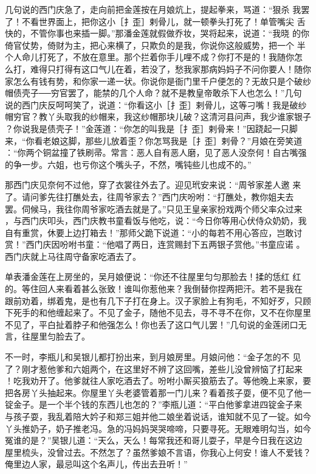 几句说的西门庆急了，走向前把金莲按在月娘炕上，提起拳来，骂道：“狠杀
我罢了！不看世界面上，把你这小［扌歪］剌骨儿，就一顿拳头打死了！单管嘴尖
舌快的，不管你事也来插一脚。”那潘金莲就假做乔妆，哭将起来，说道：“我晓
的你倚官仗势，倚财为主，把心来横了，只欺负的是我，你说你这般威势，把一个
半个人命儿打死了，不放在意里。那个拦着你手儿哩不成？你打不是的！我随你怎
么打，难得只打得有这口气儿在着，若没了，愁我家那病妈妈子不问你要人！随你
家怎么有钱有势，和你家一递一状。你说你是衙门里千户便怎的？无故只是个破纱
帽债壳子──穷官罢了，能禁的几个人命？就不是教皇帝敢杀下人也怎么！”几句
说的西门庆反呵呵笑了，说道：“你看这小［扌歪］剌骨儿，这等刁嘴！我是破纱
帽穷官？教丫头取我的纱帽来，我这纱帽那块儿破？这清河县问声，我少谁家银子
？你说我是债壳子！”金莲道：“你怎的叫我是［扌歪］剌骨来！”因跷起一只脚
来，“你看老娘这脚，那些儿放着歪？你怎骂我是［扌歪］剌骨？”月娘在旁笑道
：“你两个铜盆撞了铁刷帚。常言：恶人自有恶人磨，见了恶人没奈何！自古嘴强
的争一步。六姐，也亏你这个嘴头子，不然，嘴钝些儿也成不的。”

那西门庆见奈何不过他，穿了衣裳往外去了。迎见玳安来说：“周爷家差人邀
来了。请问爹先往打醮处去，往周爷家去？”西门庆吩咐：“打醮处，教你姐夫去
罢。伺候马，我往你周爷家吃酒去就是了。”只见王皇亲家扮戏两个师父率众过来
，与西门庆叩头，西门庆教书童看饭与他吃，说：“今日你等用心伏侍众奶奶，我
自有重赏，休要上边打箱去！”那师父跪下说道：“小的每若不用心答应，岂敢讨
赏！”西门庆因吩咐书童：“他唱了两日，连赏赐封下五两银子赏他。”书童应诺
。西门庆就上马往周守备家吃酒去了。

单表潘金莲在上房坐的，吴月娘便说：“你还不往屋里匀匀那脸去！揉的恁红
红的。等住回人来看着甚么张致！谁叫你惹他来？我倒替你捏两把汗。若不是我在
跟前劝着，绑着鬼，是也有几下子打在身上。汉子家脸上有狗毛，不知好歹，只顾
下死手的和他缠起来了。不见了金子，随他不见去，寻不寻不在你，又不在你屋里
不见了，平白扯着脖子和他强怎么！你也丢了这口气儿罢！”几句说的金莲闭口无
言，往屋里匀脸去了。

不一时，李瓶儿和吴银儿都打扮出来，到月娘房里。月娘问他：“金子怎的不
见了？刚才惹他爹和六姐两个，在这里好不辨了这回嘴，差些儿没曾辨恼了打起来
！吃我劝开了。他爹就往人家吃酒去了。吩咐小厮买狼筋去了。等他晚上来家，要
把各房丫头抽起来。你屋里丫头老婆管着那一门儿来？看着孩子耍，便不见了他一
锭金子。是一个半个钱的东西儿也怎的？”李瓶儿道：“平白他爹拿进四锭金子来
与孩子耍，我乱着陪大妗子和郑三姐并他二娘坐着说话，谁知就不见了一锭。如今
丫头推奶子，奶子推老冯。急的冯妈妈哭哭啼啼，只要寻死。无眼难明勾当，如今
冤谁的是？”吴银儿道：“天么，天么！每常我还和哥儿耍子，早是今日我在这边
屋里梳头，没曾过去。不然怎了？虽然爹娘不言语，你我心上何安！谁人不爱钱？
俺里边人家，最忌叫这个名声儿，传出去丑听！”

